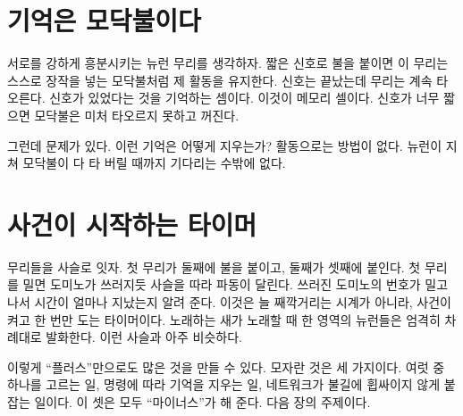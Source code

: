 \section*{기억은 모닥불이다}

서로를 강하게 흥분시키는 뉴런 무리를 생각하자. 짧은 신호로 불을 붙이면 이 무리는 스스로 장작을 넣는 모닥불처럼 제 활동을 유지한다. 신호는 끝났는데 무리는 계속 타오른다. 신호가 있었다는 것을 기억하는 셈이다. 이것이 메모리 셀이다. 신호가 너무 짧으면 모닥불은 미처 타오르지 못하고 꺼진다.

그런데 문제가 있다. 이런 기억은 어떻게 지우는가? 활동으로는 방법이 없다. 뉴런이 지쳐 모닥불이 다 타 버릴 때까지 기다리는 수밖에 없다.

\section*{사건이 시작하는 타이머}

무리들을 사슬로 잇자. 첫 무리가 둘째에 불을 붙이고, 둘째가 셋째에 붙인다. 첫 무리를 밀면 도미노가 쓰러지듯 사슬을 따라 파동이 달린다. 쓰러진 도미노의 번호가 밀고 나서 시간이 얼마나 지났는지 알려 준다. 이것은 늘 째깍거리는 시계가 아니라, 사건이 켜고 한 번만 도는 타이머이다. 노래하는 새가 노래할 때 한 영역의 뉴런들은 엄격히 차례대로 발화한다. 이런 사슬과 아주 비슷하다.

이렇게 “플러스”만으로도 많은 것을 만들 수 있다. 모자란 것은 세 가지이다. 여럿 중 하나를 고르는 일, 명령에 따라 기억을 지우는 일, 네트워크가 불길에 휩싸이지 않게 붙잡는 일이다. 이 셋은 모두 “마이너스”가 해 준다. 다음 장의 주제이다.

